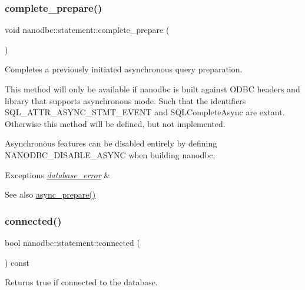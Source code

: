 \subsubsection{\texorpdfstring{complete\_prepare()}{complete\_prepare()}}
{\footnotesize\ttfamily void nanodbc\+::statement\+::complete\+\_\+prepare (\begin{DoxyParamCaption}{ }\end{DoxyParamCaption})}



Completes a previously initiated asynchronous query preparation. 

This method will only be available if nanodbc is built against O\+D\+BC headers and library that supports asynchronous mode. Such that the identifiers {\ttfamily S\+Q\+L\+\_\+\+A\+T\+T\+R\+\_\+\+A\+S\+Y\+N\+C\+\_\+\+S\+T\+M\+T\+\_\+\+E\+V\+E\+NT} and {\ttfamily S\+Q\+L\+Complete\+Async} are extant. Otherwise this method will be defined, but not implemented.

Asynchronous features can be disabled entirely by defining {\ttfamily N\+A\+N\+O\+D\+B\+C\+\_\+\+D\+I\+S\+A\+B\+L\+E\+\_\+\+A\+S\+Y\+NC} when building nanodbc.


\begin{DoxyExceptions}{Exceptions}
{\em \mbox{\hyperlink{classnanodbc_1_1database__error}{database\+\_\+error}}} & \\
\hline
\end{DoxyExceptions}
\begin{DoxySeeAlso}{See also}
\mbox{\hyperlink{classnanodbc_1_1statement_ab676933b9578da7d773f97269d270eee}{async\+\_\+prepare()}} 
\end{DoxySeeAlso}
\mbox{\label{classnanodbc_1_1statement_aa3e77eb9771cf5d8478208b0a9e2c59a}} 
\subsubsection{\texorpdfstring{connected()}{connected()}}
{\footnotesize\ttfamily bool nanodbc\+::statement\+::connected (\begin{DoxyParamCaption}{ }\end{DoxyParamCaption}) const}



Returns true if connected to the database. 



